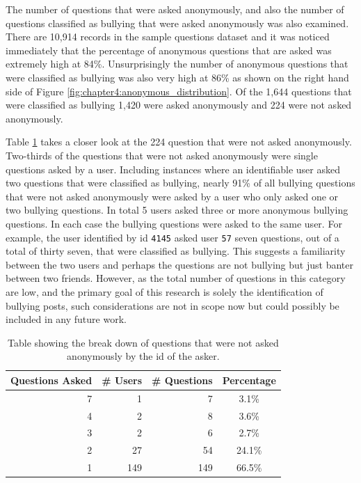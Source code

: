 The number of questions that were asked anonymously, and also the number of questions classified as bullying that were asked anonymously was also examined. There are 10,914 records in the sample questions dataset and it was noticed immediately that the percentage of anonymous questions that are asked was extremely high at 84\%. Unsurprisingly the number of anonymous questions that were classified as bullying was also very high at 86\% as shown on the right hand side of Figure \ref{fig:chapter4:anonymous_distribution}. Of the 1,644 questions that were classified as bullying 1,420 were asked anonymously and 224 were not asked anonymously.

Table \ref{tab:chapter4:not_anon_bullying} takes a closer look at the 224 question that were not asked anonymously. Two-thirds of the questions that were not asked anonymously were single questions asked by a user. Including instances where an identifiable user asked two questions that were classified as bullying, nearly 91\% of all bullying questions that were not asked anonymously were asked by a user who only asked one or two bullying questions. In total 5 users asked three or more anonymous bullying questions. In each case the bullying questions were asked to the same user. For example, the user identified by id \verb|4145| asked user \verb|57| seven questions, out of a total of thirty seven, that were classified as bullying. This suggests a familiarity between the two users and perhaps the questions are not bullying but just banter between two friends. However, as the total number of questions in this category are low, and the primary goal of this research is solely the identification of bullying posts, such considerations are not in scope now but could possibly be included in any future work.

\begin{table}[h]
\centering
\caption[Bullying questions that are not anonymous]{Table showing the break down of questions that were not asked anonymously by the id of the asker.}
\label{tab:chapter4:not_anon_bullying}
\begin{tabular}{rrrc}
	\toprule
    \textbf{Questions Asked} & \textbf{\# Users} & \textbf{\# Questions} & \textbf{Percentage}            \\
    \midrule
	7	& 1		&	7	&	3.1\%	\\
	4	& 2		&	8	&	3.6\%	\\
	3	& 2		&	6	&	2.7\%	\\
	2	& 27	&	54	&	24.1\%	\\
	1	& 149	&	149	&	66.5\%	\\
    \bottomrule
    \end{tabular}
\end{table}

